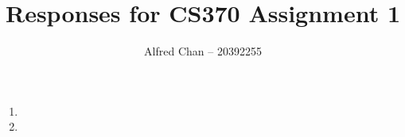 \documentclass[12pt]{article}
\title{Responses for CS370 Assignment 1}
\author{Alfred Chan -- 20392255}
\begin{document}
\maketitle

\begin{enumerate}
\item
\item

\end{enumerate}
\end{document}
